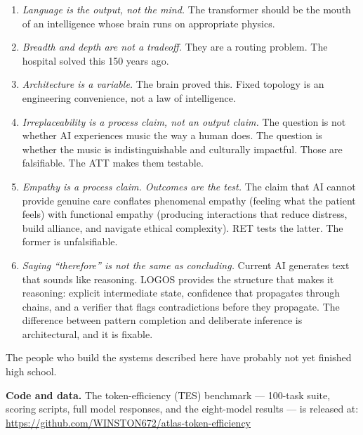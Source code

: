 \documentclass[12pt]{article}
\begin{document}
\begin{enumerate}
    \item \textit{Language is the output, not the mind.} The transformer should be the mouth of an intelligence whose brain runs on appropriate physics.

    \item \textit{Breadth and depth are not a tradeoff.} They are a routing problem. The hospital solved this 150 years ago.

    \item \textit{Architecture is a variable.} The brain proved this. Fixed topology is an engineering convenience, not a law of intelligence.

    \item \textit{Irreplaceability is a process claim, not an output claim.} The question is not whether AI experiences music the way a human does. The question is whether the music is indistinguishable and culturally impactful. Those are falsifiable. The ATT makes them testable.

    \item \textit{Empathy is a process claim. Outcomes are the test.} The claim that AI cannot provide genuine care conflates phenomenal empathy (feeling what the patient feels) with functional empathy (producing interactions that reduce distress, build alliance, and navigate ethical complexity). RET tests the latter. The former is unfalsifiable.

    \item \textit{Saying ``therefore'' is not the same as concluding.} Current AI generates text that sounds like reasoning. LOGOS provides the structure that makes it reasoning: explicit intermediate state, confidence that propagates through chains, and a verifier that flags contradictions before they propagate. The difference between pattern completion and deliberate inference is architectural, and it is fixable.
\end{enumerate}

The people who build the systems described here have probably not yet finished high school.

\vspace{1em}
\noindent\textbf{Code and data.} The token-efficiency (TES) benchmark --- 100-task suite, scoring scripts, full model responses, and the eight-model results --- is released at: \url{https://github.com/WINSTON672/atlas-token-efficiency}
\end{document}
